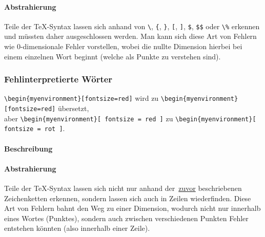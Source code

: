 \paragraph*{Abstrahierung}
Teile der \TeX{}-Syntax lassen sich anhand von \verb|\|, \verb|{|, \verb|}|, \verb|[|, \verb|]|, \verb|$|, \verb|$$| oder \verb|\%| erkennen und müssten daher ausgeschlossen werden. Man kann sich diese Art von Fehlern wie 0-dimensionale Fehler vorstellen, wobei die nullte Dimension hierbei bei einem einzelnen Wort beginnt (welche als Punkte zu verstehen sind).

\subsubsection{Fehlinterpretierte Wörter}\label{problems:dim1}%
\verb|\begin{myenvironment}[fontsize=red]| wird zu \verb|\begin{myenvironment}[fontsize=red]| übersetzt,\\aber \verb|\begin{myenvironment}[ fontsize = red ]| zu \verb|\begin{myenvironment}[ fontsize = rot ]|.
\paragraph*{Beschreibung}
\paragraph*{Abstrahierung}
Teile der \TeX-Syntax lassen sich nicht nur anhand der~\hyperref[problems:unexpectedCharacters]{zuvor} beschriebenen Zeichenketten erkennen, sondern lassen sich auch in Zeilen wiederfinden. Diese Art von Fehlern bahnt den Weg zu einer Dimension, wodurch nicht nur innerhalb eines Wortes (Punktes), sondern auch zwischen verschiedenen Punkten Fehler entstehen könnten (also innerhalb einer Zeile).

\newpage

